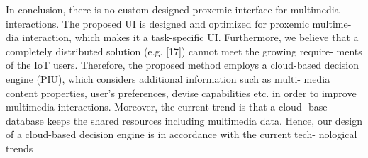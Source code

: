 \documentclass[runningheads,a4paper]{llncs}
\begin{document}
In conclusion, there is no custom designed proxemic interface for multimedia interactions. The proposed UI is designed and optimized for proxemic multime- dia interaction, which makes it a task-specific UI. Furthermore, we believe that a completely distributed solution (e.g. [17]) cannot meet the growing require- ments of the IoT users. Therefore, the proposed method employs a cloud-based decision engine (PIU), which considers additional information such as multi- media content properties, user’s preferences, devise capabilities etc. in order to improve multimedia interactions. Moreover, the current trend is that a cloud- base database keeps the shared resources including multimedia data. Hence, our design of a cloud-based decision engine is in accordance with the current tech- nological trends
\end{document}
